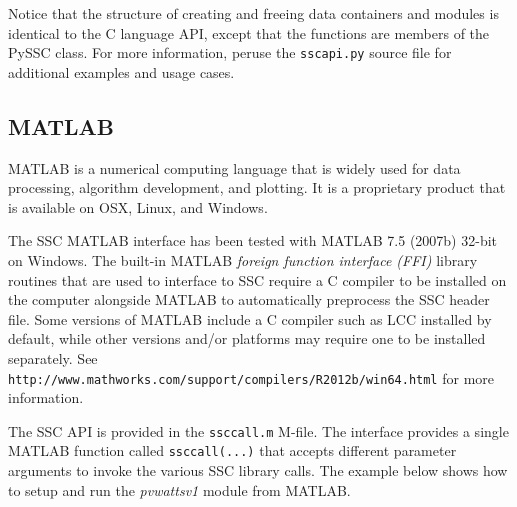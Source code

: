 \documentclass{article}
\begin{document}
Notice that the structure of creating and freeing data containers and modules is identical to the C language API, except that the functions are members of the PySSC class.  For more information, peruse the \texttt{sscapi.py} source file for additional examples and usage cases.

\subsection{MATLAB}

MATLAB is a numerical computing language that is widely used for data processing, algorithm development, and plotting.  It is a proprietary product that is available on OSX, Linux, and Windows.  

The SSC MATLAB interface has been tested with MATLAB 7.5 (2007b) 32-bit on Windows.  The built-in MATLAB \emph{foreign function interface (FFI)} library routines that are used to interface to SSC require a C compiler to be installed on the computer alongside MATLAB to automatically preprocess the SSC header file.  Some versions of MATLAB include a C compiler such as LCC installed by default, while other versions and/or platforms may require one to be installed separately.  See \texttt{http://www.mathworks.com/support/compilers/R2012b/win64.html} for more information.

The SSC API is provided in the \texttt{ssccall.m} M-file.  The interface provides a single MATLAB function called \texttt{ssccall(...)} that accepts different parameter arguments to invoke the various SSC library calls.  The example below shows how to setup and run the \emph{pvwattsv1} module from MATLAB.
\end{document}
